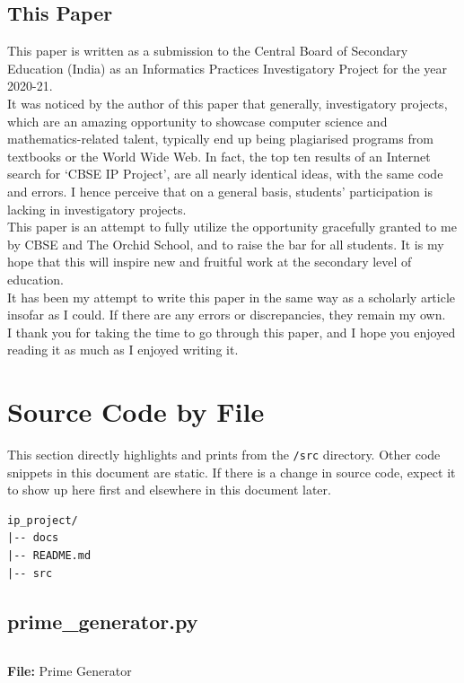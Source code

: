 \documentclass[titlepage]{article}
\newenvironment{longlisting}{\captionsetup{type=listing}}{}
\begin{document}

\subsection{This Paper}
This paper is written as a submission to the Central Board of Secondary Education (India) as an
Informatics Practices Investigatory Project for the year 2020-21. \\
It was noticed by the author of this paper that generally, investigatory projects, which are an
amazing opportunity to showcase computer science and mathematics-related talent, typically end up being
plagiarised programs from textbooks or the World Wide Web. In fact, the top ten results of an
Internet search for `CBSE IP Project', are all nearly identical ideas, with the same code and
errors. I hence perceive that on a general basis, students' participation is lacking in
investigatory projects.\\
This paper is an attempt to fully utilize the opportunity gracefully granted to me by CBSE and The
Orchid School, and to raise the bar for all students. It is my hope that this will inspire new and
fruitful work at the secondary level of education.\\
It has been my attempt to write this paper in the same way as a scholarly article insofar as I
could. If there are any errors or discrepancies, they remain my own.\\
I thank you for taking the time to go through this paper, and I hope you enjoyed reading it as much
as I enjoyed writing it.\\


\cleardoublepage


\section{Source Code by File}
This section directly highlights and prints from the \texttt{/src} directory. Other code snippets in
this document are static. If there is a change in source code, expect it to show up here first and
elsewhere in this document later.
\begin{verbatim}
ip_project/
|-- docs
|-- README.md
|-- src
\end{verbatim}

\subsection{prime\_generator.py}
\begin{longlisting}
\inputminted{python}{../src/prime_generator.py}
\caption{\textbf{File:} Prime Generator}
\end{longlisting}
\end{document}

